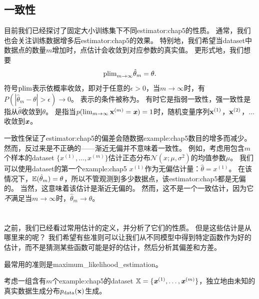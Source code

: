
\subsection{一致性}
\label{sec:consistency}
目前我们已经探讨了固定大小训练集下不同\gls{estimator:chap5}的性质。
通常，我们也会关注训练数据增多后\gls{estimator:chap5}的效果。
特别地，我们希望当\gls{dataset}中数据点的数量$m$增加时，点估计会收敛到对应参数的真实值。
更形式地，我们想要
\begin{equation}
\label{eq:5.55}
    \text{plim}_{m\to\infty} \hat{\theta}_m = \theta.
\end{equation}
符号$\text{plim}$表示依概率收敛，即对于任意的$\epsilon > 0$，当$m\to\infty$时，有$P(|\hat{\theta}_m - \theta| > \epsilon) \to 0$。
表示的条件被称为。
有时它是指弱一致性，强一致性是指从$\hat{\theta}$收敛到$\theta$。
是指当$p(\lim_{m\to\infty} \mathbf{x}^{(m)} = \boldsymbol{\mathit{x}}) = 1 $时，随机变量序列$\mathbf{x}^{(1)}$，$\mathbf{x}^{(2)}$，$\dots$收敛到$\boldsymbol{\mathit{x}}$。

一致性保证了\gls{estimator:chap5}的偏差会随数据\gls{example:chap5}数目的增多而减少。
然而，反过来是不正确的——渐近无偏并不意味着一致性。
例如，考虑用包含$m$个样本的\gls{dataset} $\{x^{(1)},\dots,x^{(m)}\}$估计正态分布$\mathcal{N}(x;\mu,\sigma^2)$的均值参数$\mu$。
我们可以使用\gls{dataset}的第一个\gls{example:chap5} $x^{(1)}$作为无偏估计量：$\hat{\theta} = x^{(1)}$。
在该情况下，$\mathbb{E}(\hat{\theta}_m) = \theta$，所以不管观测到多少数据点，该\gls{estimator:chap5}都是无偏的。
当然，这意味着该估计是渐近无偏的。
然而，这不是一个一致估计，因为它\emph{不}满足当$m\to\infty$时，$\hat{\theta}_m \to \theta$。


\section{}
\label{sec:maximum_likelihood_estimation}
之前，我们已经看过常用估计的定义，并分析了它们的性质。
但是这些估计是从哪里来的呢？
我们希望有些准则可以让我们从不同模型中得到特定函数作为好的估计，而不是猜测某些函数可能是好的估计，然后分析其偏差和方差。

最常用的准则是\gls{maximum_likelihood_estimation}。

考虑一组含有$m$个\gls{example:chap5}的\gls{dataset} $\mathbb{X}=\{ \boldsymbol{\mathit{x}}^{(1)},\dots, \boldsymbol{\mathit{x}}^{(m)} \}$，独立地由未知的真实数据生成分布$p_{\text{data}}(\mathbf{x})$生成。

